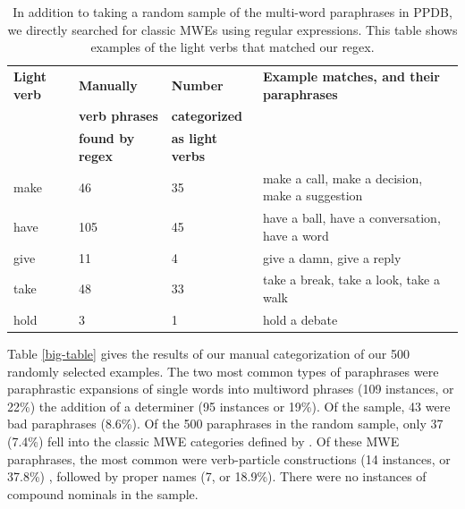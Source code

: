 \documentclass[11pt]{article}
\begin{document}
\begin{center}
\begin{table}
\hfill{}
\begin{tabular}{|l|l|l|p{.5\linewidth}|}
\hline \bf Light verb & \bf Manually  & \bf Number  & \bf Example matches, and their paraphrases\\ 
 & \bf verb phrases & \bf  categorized & \\ 
 & \bf  found by regex & \bf as light verbs & \\ \hline
make & 46 & 35 & make a call, make a decision, make a suggestion\\
have & 105 & 45 & have a ball, have a conversation, have a word\\
give & 11 & 4 & give a damn, give a reply\\
take & 48 & 33 & take a break, take a look, take a walk\\
hold & 3 & 1 & hold a debate\\
\hline
\end{tabular}
\hfill{}
\caption{In addition to taking a random sample of the multi-word paraphrases in PPDB, we directly searched for classic MWEs using regular expressions. This table shows examples of the light verbs that matched our regex. }
\label{light-verbs}
\end{table}
\end{center}

Table \ref{big-table} gives the results of our manual categorization of our 500 randomly selected examples.  
The two most common types of paraphrases were paraphrastic expansions of single words into multiword phrases (109 instances, or 22\%) 
 the addition of a determiner (95 instances or 19\%). Of the sample, 43 were bad paraphrases (8.6\%).  Of the 500 paraphrases in the random sample, only 37 (7.4\%) fell into the classic MWE categories defined by . Of these MWE paraphrases, the most common were verb-particle constructions (14 instances, or 37.8\%) , followed by proper names (7, or 18.9\%). There were no instances of compound nominals in the sample.
\end{document}
